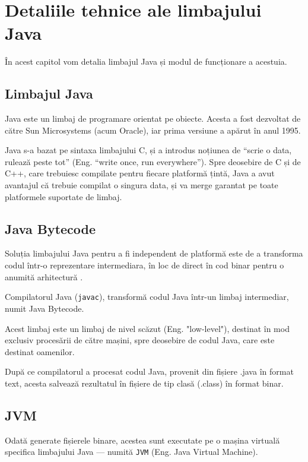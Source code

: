 \chapter{Detaliile tehnice ale limbajului Java}

În acest capitol vom detalia limbajul Java și modul de
funcționare a acestuia.

\section{Limbajul Java}

Java este un limbaj de programare orientat pe obiecte. Acesta a fost
dezvoltat de către Sun Microsystems (acum Oracle), iar prima versiune a
apărut în anul 1995.

Java s-a bazat pe sintaxa limbajului C, și a introdus noțiunea de
``scrie o data, rulează peste tot'' (Eng. ``write once, run
everywhere''). Spre deosebire de C și de C++, care trebuiesc compilate
pentru fiecare platformă țintă, Java a avut avantajul că trebuie
compilat o singura data, și va merge garantat pe toate platformele
suportate de limbaj.

\section{Java Bytecode}

Soluția limbajului Java pentru a fi independent de platformă este de a
transforma codul într-o reprezentare intermediara, în loc de direct în
cod binar pentru o anumită arhitectură .

Compilatorul Java (\texttt{javac}), transformă codul Java într-un limbaj
intermediar, numit Java Bytecode.

Acest limbaj este un limbaj de nivel scăzut (Eng. "low-level"), destinat în mod exclusiv
procesării de către mașini, spre deosebire de codul Java, care este
destinat oamenilor.

După ce compilatorul a procesat codul Java, provenit din fișiere .java în
format text, acesta salvează rezultatul în fișiere de tip clasă (.class)
în format binar.

\section{JVM}

Odată generate fișierele binare, acestea sunt executate pe o mașina
virtuală specifica limbajului Java --- numită \texttt{JVM}
(Eng. Java Virtual Machine).

